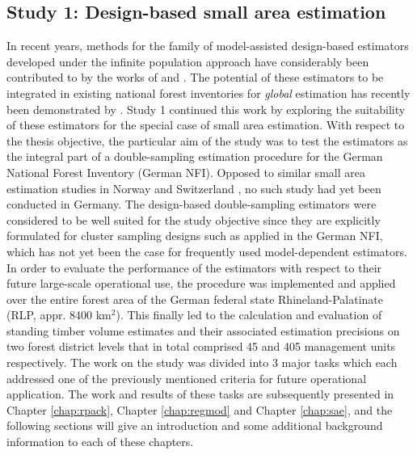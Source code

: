 \subsection{Study 1: Design-based small area estimation}
\label{sec:study1}


In recent years, methods for the family of model-assisted design-based estimators developed under the infinite population approach have considerably been contributed to by the works of \citet{mandallaz1991, mandallaz2008, mandallaz2013a, mandallaz2013c} and \citet{mandallaz2013b}. The potential of these estimators to be integrated in existing national forest inventories for \textit{global} estimation has recently been demonstrated by \citet{massey2015_thesis}. Study 1 continued this work by exploring the suitability of these estimators for the special case of small area estimation. With respect to the thesis objective, the particular aim of the study was to test the estimators as the integral part of a double-sampling estimation procedure for the German National Forest Inventory (German NFI). Opposed to similar small area estimation studies in Norway \citep{breidenbach2012} and Switzerland \citep{magnussen2014a, steinmann2013}, no such study had yet been conducted in Germany. The design-based double-sampling estimators were considered to be well suited for the study objective since they are explicitly formulated for cluster sampling designs such as applied in the German NFI, which has not yet been the case for frequently used model-dependent estimators. In order to evaluate the performance of the estimators with respect to their future large-scale operational use, the procedure was implemented and applied over the entire forest area of the German federal state Rhineland-Palatinate (RLP, appr. 8400 km$^2$). This finally led to the calculation and evaluation of standing timber volume estimates and their associated estimation precisions on two forest district levels that in total comprised 45 and 405 management units respectively. The work on the study was divided into 3 major tasks which each addressed one of the previously mentioned criteria for future operational application. The work and results of these tasks are subsequently presented in Chapter \ref{chap:rpack}, Chapter \ref{chap:regmod} and Chapter \ref{chap:sae}, and the following sections will give an introduction and some additional background information to each of these chapters.


